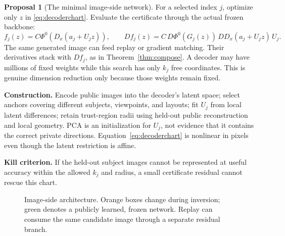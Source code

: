 \documentclass[11pt,a4paper]{article}
\theoremstyle{definition}
\theoremstyle{definition}
\newtheorem{proposal}[theorem]{Proposal}
\theoremstyle{remark}\newtheorem{remark}[theorem]{Remark}
\begin{document}
\begin{proposal}[The minimal image-side network]\label{pr:minnetwork}
For a selected index $j$, optimize only $z$ in \eqref{eq:decoderchart}. Evaluate the certificate through the actual frozen backbone:
\[
f_j(z)=C\Phi^0(D_x(a_j+U_jz)),\qquad
Df_j(z)=C\,D\Phi^0(G_j(z))\,DD_x(a_j+U_jz)\,U_j.
\]
The same generated image can feed replay or gradient matching. Their derivatives stack with $Df_j$, as in Theorem~\ref{thm:compose}. A decoder may have millions of fixed weights while this search has only $k_j$ free coordinates. This is genuine dimension reduction only because those weights remain fixed.

\textbf{Construction.} Encode public images into the decoder's latent space; select anchors covering different subjects, viewpoints, and layouts; fit $U_j$ from local latent differences; retain trust-region radii using held-out public reconstruction and local geometry. PCA is an initialization for $U_j$, not evidence that it contains the correct private directions. Equation~\eqref{eq:decoderchart} is nonlinear in pixels even though the latent restriction is affine.

\textbf{Kill criterion.} If the held-out subject images cannot be represented at useful accuracy within the allowed $k_j$ and radius, a small certificate residual cannot rescue this chart.
\end{proposal}

\begin{figure}[htbp]
\centering
{}
\caption{Image-side architecture. Orange boxes change during inversion; green denotes a publicly learned, frozen network. Replay can consume the same candidate image through a separate residual branch.}
\label{fig:imagechart}
\end{figure}
\end{document}

